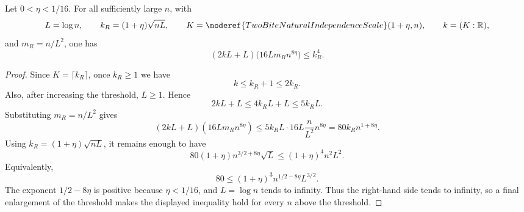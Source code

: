 \begin{helper}
Let \(0<\eta<1/16\).  For all sufficiently large \(n\), with
\[
L=\log n,\qquad
k_R=(1+\eta)\sqrt{nL},\qquad
K=\noderef{TwoBiteNaturalIndependenceScale}(1+\eta,n),\qquad
k=(K:\mathbb R),
\]
and \(m_R=n/L^2\), one has
\[
(2kL+L)\bigl(16Lm_R n^{8\eta}\bigr)\le k_R^4 .
\]
\end{helper}
\begin{proof}
Since \(K=\lceil k_R\rceil\), once \(k_R\ge1\) we have
\[
k\le k_R+1\le2k_R .
\]
Also, after increasing the threshold, \(L\ge1\).  Hence
\[
2kL+L\le4k_RL+L\le5k_RL .
\]
Substituting \(m_R=n/L^2\) gives
\[
(2kL+L)(16Lm_Rn^{8\eta})
\le 5k_RL\cdot16L\frac n{L^2}n^{8\eta}
=80k_Rn^{1+8\eta}.
\]
Using \(k_R=(1+\eta)\sqrt{nL}\), it remains enough to have
\[
80(1+\eta)n^{3/2+8\eta}\sqrt L
\le (1+\eta)^4n^2L^2 .
\]
Equivalently,
\[
80\le (1+\eta)^3 n^{1/2-8\eta}L^{3/2}.
\]
The exponent \(1/2-8\eta\) is positive because \(\eta<1/16\), and
\(L=\log n\) tends to infinity.  Thus the right-hand side tends to infinity,
so a final enlargement of the threshold makes the displayed inequality hold
for every \(n\) above the threshold.
\end{proof}

